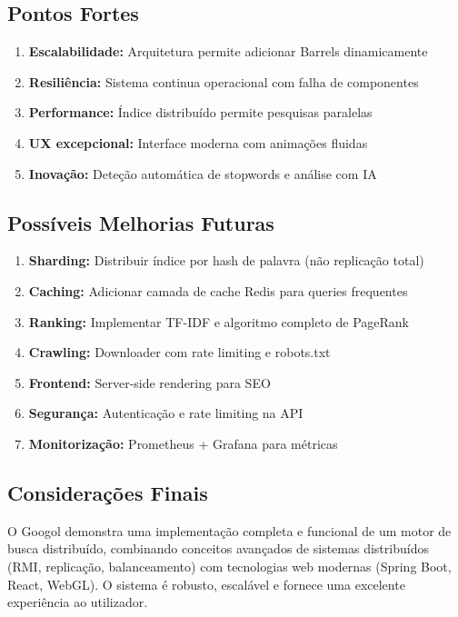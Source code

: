 \documentclass[12pt,a4paper]{article}
\begin{document}
\subsection{Pontos Fortes}

\begin{enumerate}
    \item \textbf{Escalabilidade:} Arquitetura permite adicionar Barrels dinamicamente
    \item \textbf{Resiliência:} Sistema continua operacional com falha de componentes
    \item \textbf{Performance:} Índice distribuído permite pesquisas paralelas
    \item \textbf{UX excepcional:} Interface moderna com animações fluidas
    \item \textbf{Inovação:} Deteção automática de stopwords e análise com IA
\end{enumerate}

\subsection{Possíveis Melhorias Futuras}

\begin{enumerate}
    \item \textbf{Sharding:} Distribuir índice por hash de palavra (não replicação total)
    \item \textbf{Caching:} Adicionar camada de cache Redis para queries frequentes
    \item \textbf{Ranking:} Implementar TF-IDF e algoritmo completo de PageRank
    \item \textbf{Crawling:} Downloader com rate limiting e robots.txt
    \item \textbf{Frontend:} Server-side rendering para SEO
    \item \textbf{Segurança:} Autenticação e rate limiting na API
    \item \textbf{Monitorização:} Prometheus + Grafana para métricas
\end{enumerate}

\subsection{Considerações Finais}

O Googol demonstra uma implementação completa e funcional de um motor de busca distribuído, combinando conceitos avançados de sistemas distribuídos (RMI, replicação, balanceamento) com tecnologias web modernas (Spring Boot, React, WebGL). O sistema é robusto, escalável e fornece uma excelente experiência ao utilizador.
\end{document}
